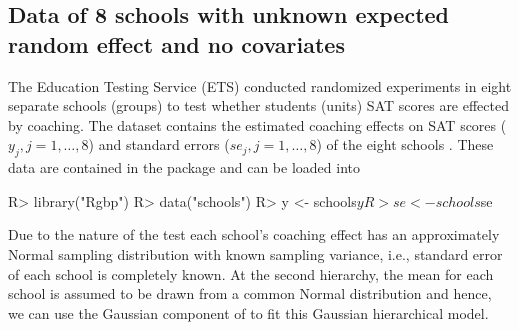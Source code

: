 \documentclass[article]{jss}
\begin{document}



\subsection[Unknown Second-level Mean and No Covariate]{Data of 8 schools with unknown expected random effect and no covariates} \label{sec:ex:8schools}

The Education Testing Service (ETS) conducted randomized experiments in eight
separate schools (groups) to test whether students (units) SAT scores are
effected by coaching. The dataset contains the estimated coaching effects on SAT
scores ($y_{j}, j=1, \ldots, 8$) and standard errors ($se_{j}, j=1, \ldots, 8$)
of the eight schools \citep{1981}. These data are contained in the package and can be loaded into 
\begin{CodeChunk}
\begin{CodeInput}
R> library("Rgbp")
R> data("schools")
R> y  <- schools$y
R> se <- schools$se
\end{CodeInput}
\end{CodeChunk}


Due to the nature of the test each school's coaching effect has an approximately Normal sampling distribution with known sampling variance, i.e., standard error of each school is completely known. At the second hierarchy, the mean for each school is assumed to be drawn from a common Normal distribution and hence, we can use the Gaussian component of  to fit this Gaussian hierarchical model.
\end{document}
